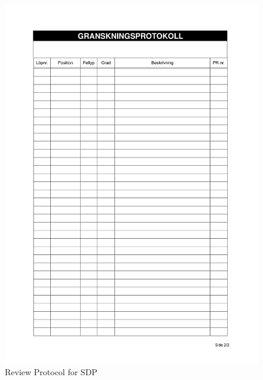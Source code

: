 \documentclass{article}
\begin{document}
 \begin{figure}
     \centering
     \includegraphics[width=13cm]{images/SDP - Granskningsprotokoll-2}
     \renewcommand\figurename{Figure}
     \caption{Review Protocol for SDP}
     \label{fig:my_label}
 \end{figure}
 
\end{document}
